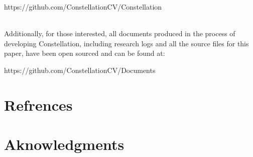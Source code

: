 \documentclass[preprint,12pt]{elsarticle}
\begin{document}
\begin{centering}
\textsf{https://github.com/ConstellationCV/Constellation}\\~\\
\end{centering}

Additionally, for those interested, all documents produced in the process of developing Constellation, including research logs and all the source files for this paper, have been open sourced and can be found at:\\

\begin{centering}
\textsf{https://github.com/ConstellationCV/Documents}\\
\end{centering}
\pagebreak

\tocless\section{Refrences}
\label{A:2}



\pagebreak
\tocless\section{Aknowledgments}
\label{A:3}









\restoregeometry
\end{document}
